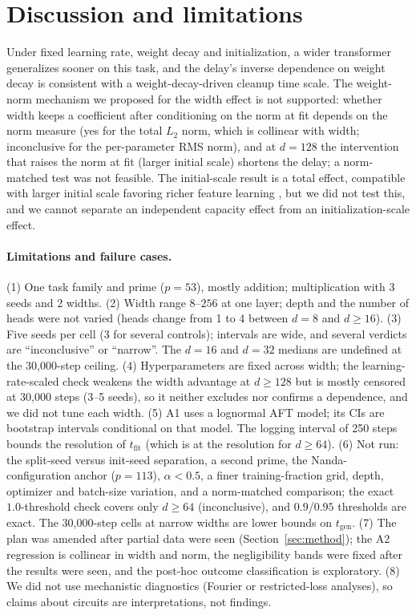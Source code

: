 \documentclass{article}
\newcommand{\tfit}{t_{\mathrm{fit}}}
\newcommand{\tgen}{t_{\mathrm{gen}}}
\begin{document}
\section{Discussion and limitations}
\label{sec:disc}
Under fixed learning rate, weight decay and initialization, a wider transformer generalizes sooner on this task, and the delay's inverse dependence on weight decay is consistent with a weight-decay-driven cleanup time scale. The weight-norm mechanism we proposed for the width effect is not supported: whether width keeps a coefficient after conditioning on the norm at fit depends on the norm measure (yes for the total $L_2$ norm, which is collinear with width; inconclusive for the per-parameter RMS norm), and at $d=128$ the intervention that raises the norm at fit (larger initial scale) shortens the delay; a norm-matched test was not feasible. The initial-scale result is a total effect, compatible with larger initial scale favoring richer feature learning \citep{kumar2024grokking,liu2023omnigrok}, but we did not test this, and we cannot separate an independent capacity effect from an initialization-scale effect.

\paragraph{Limitations and failure cases.}
(1) One task family and prime ($p=53$), mostly addition; multiplication with 3 seeds and 2 widths.
(2) Width range $8$--$256$ at one layer; depth and the number of heads were not varied (heads change from 1 to 4 between $d=8$ and $d\ge16$).
(3) Five seeds per cell (3 for several controls); intervals are wide, and several verdicts are ``inconclusive'' or ``narrow''. The $d=16$ and $d=32$ medians are undefined at the 30{,}000-step ceiling.
(4) Hyperparameters are fixed across width; the learning-rate-scaled check weakens the width advantage at $d\ge128$ but is mostly censored at 30{,}000 steps (3--5 seeds), so it neither excludes nor confirms a dependence, and we did not tune each width.
(5) A1 uses a lognormal AFT model; its CIs are bootstrap intervals conditional on that model. The logging interval of 250 steps bounds the resolution of $\tfit$ (which is at the resolution for $d\ge64$).
(6) Not run: the split-seed versus init-seed separation, a second prime, the Nanda-configuration anchor ($p=113$), $\alpha<0.5$, a finer training-fraction grid, depth, optimizer and batch-size variation, and a norm-matched comparison; the exact $1.0$-threshold check covers only $d\ge64$ (inconclusive), and $0.9$/$0.95$ thresholds are exact. The 30{,}000-step cells at narrow widths are lower bounds on $\tgen$.
(7) The plan was amended after partial data were seen (Section~\ref{sec:method}); the A2 regression is collinear in width and norm, the negligibility bands were fixed after the results were seen, and the post-hoc outcome classification is exploratory.
(8) We did not use mechanistic diagnostics (Fourier or restricted-loss analyses), so claims about circuits are interpretations, not findings.
\end{document}
